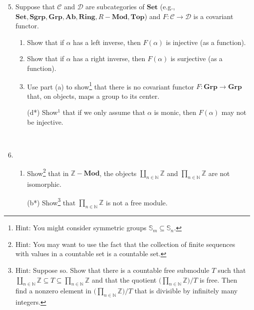 \documentclass{amsart}[12pt]
\def\sC{\mathscr C}
\def\sD{\mathscr  D}
\newcommand{\Z}{\mathbb{Z}}
\newcommand{\N}{\mathbb{N}}
\numberwithin{equation}{section}
\theoremstyle{plain} %
\theoremstyle{definition}
\theoremstyle{remark}
\newcommand{\Set}{\mathbf{Set}}
\newcommand{\Grp}{\mathbf{Grp}}
\newcommand{\Ab}{\mathbf{Ab}}
\newcommand{\Sgrp}{\mathbf{Sgrp}}
\newcommand{\Ring}{\mathbf{Ring}}
\newcommand{\Mod}[1]{#1-\mathbf{Mod}}
\newcommand{\Top}{\mathbf{Top}}
\begin{document}
\begin{enumerate}\setcounter{enumi}{4}
\item 
Suppose that $\sC$ and $\sD$ are subcategories of $\Set$ (e.g., $\Set,\Sgrp,\Grp,\Ab,\Ring,\Mod{R},\Top$) and $F:\sC\to \sD$ is a covariant functor.
\begin{enumerate}
\item Show that if $\alpha$ has a left inverse, then $F(\alpha)$ is injective (as a function).
\item Show that if $\alpha$ has a right inverse, then $F(\alpha)$ is surjective (as a function).
\item Use part (a) to show\footnote{Hint: You might consider symmetric groups $\mathbb{S}_m \subseteq \mathbb{S}_n$.} that there is no covariant functor $F:\Grp\to \Grp$ that, on objects, maps a group to its center.
\item[(d*)] Show$^1$ that if we only assume that $\alpha$ is monic, then $F(\alpha)$ may not be injective.
\end{enumerate}

\
\item
\begin{enumerate}
\item Show\footnote{Hint: You may want to use the fact that the collection of finite sequences with values in a countable set is a countable set.} that in $\Mod{\Z}$, the objects $\coprod_{n\in \N} \Z$ and $\prod_{n\in \N} \Z$ are not isomorphic.
\item[(b*)] Show\footnote{Hint: Suppose so. Show that there is a countable free submodule $T$ such that $\coprod_{n\in \N} \Z \subseteq T \subseteq \prod_{n\in \N} \Z$ and that the quotient $ \big(\prod_{n\in \N} \Z\big) / T$ is free. Then find a nonzero element in $ \big(\prod_{n\in \N} \Z\big)/T$ that is divisible by infinitely many integers.} that $\prod_{n\in \N} \Z$ is not a free module.
\end{enumerate}
\end{enumerate}
\end{document}
